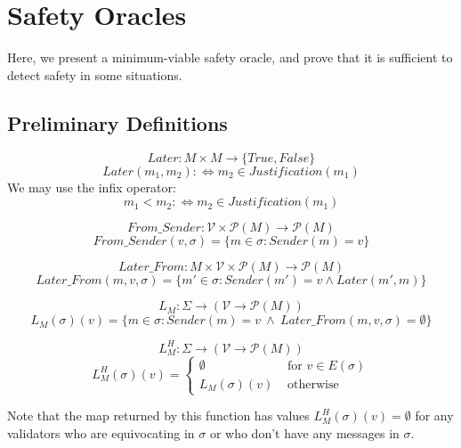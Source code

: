 \section{Safety Oracles}
Here, we present a minimum-viable safety oracle, and prove that it is sufficient to detect safety in some situations.

\subsection{Preliminary Definitions}

\begin{defn}[Later]
$$
Later:M \times M \to \{True, False\}
$$
$$
Later(m_1, m_2) :\Leftrightarrow m_2 \in Justification(m_1)
$$
We may use the infix operator:
$$
m_1 < m_2 :\Leftrightarrow m_2 \in Justification(m_1)
$$
\end{defn}

\begin{defn}
$$
From\_Sender: \mathcal{V} \times \mathcal{P}(M) \to \mathcal{P}(M)
$$
$$
From\_Sender(v, \sigma) = \{m \in \sigma : Sender(m) = v\}
$$
\end{defn}

\begin{defn}
$$
Later\_From: M \times \mathcal{V} \times \mathcal{P}(M) \to \mathcal{P}(M)
$$
$$
Later\_From(m, v, \sigma) = \{m' \in \sigma : Sender(m') = v \land Later(m', m)\}
$$
\end{defn}

\begin{defn}
$$
L_M:\Sigma \to (\mathcal{V} \to \mathcal{P}(M))
$$
$$
L_M(\sigma)(v) = \{m \in \sigma : Sender(m) = v ~\land~ Later\_From(m,v,\sigma) = \emptyset\}
$$
\end{defn}


\begin{defn}
$$
L^H_M:\Sigma \to (\mathcal{V} \to \mathcal{P}(M))
$$
\[ L^H_M(\sigma)(v) = \left\{
\begin{array}{ll}
      \emptyset& \text{ for } v \in E(\sigma) \\
      L_M(\sigma)(v)& \text{ otherwise }
\end{array}
\right. \]
\end{defn}

Note that the map returned by this function has values $L^H_M(\sigma)(v) = \emptyset$ for any validators who are equivocating in $\sigma$ or who don't have any messages in $\sigma$.

